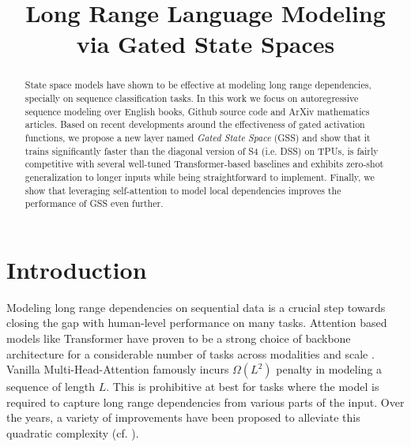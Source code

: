 \title{Long Range Language Modeling via Gated State Spaces}

\begin{abstract}

State space models have shown to be effective at modeling long range dependencies, specially on sequence classification tasks. In this work we focus on autoregressive sequence modeling over English books, Github source code and ArXiv mathematics articles. Based on recent developments around the effectiveness of gated activation functions, we propose a new layer named \textit{Gated State Space} (GSS) and show that it trains significantly faster than the diagonal version of S4 (i.e. DSS) on TPUs, is fairly competitive with several well-tuned Transformer-based baselines and exhibits zero-shot generalization to longer inputs while being straightforward to implement. Finally, we show that leveraging self-attention to model local dependencies improves the performance of GSS even further.
\end{abstract}

\section{Introduction}

Modeling long range dependencies on sequential data is a crucial step towards closing the gap with human-level performance on many tasks. Attention based models like Transformer \citep{vaswani2017attention} have proven to be a strong choice of backbone architecture for a considerable number of tasks across modalities and scale \citep{devlin2018bert,brown2020language,dosovitskiy2021an_vit}. Vanilla Multi-Head-Attention famously incurs $\Omega(L^2)$ penalty in modeling a sequence of length $L$. This is prohibitive at best for tasks where the model is required to capture long range dependencies from various parts of the input. Over the years, a variety of improvements have been proposed to alleviate this quadratic complexity (cf. \citep{tay2020efficient}). 

